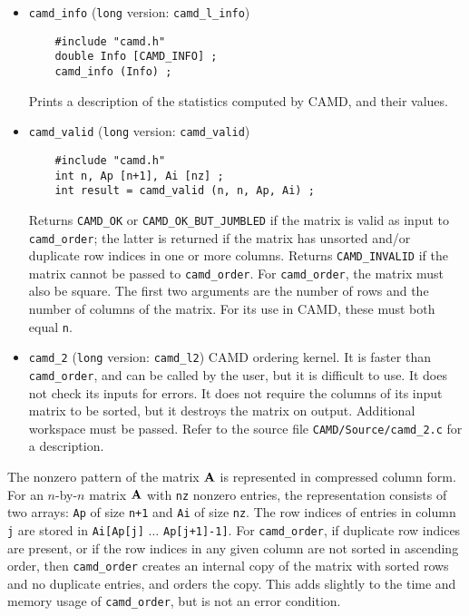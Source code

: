 \documentclass[11pt]{article}
\newcommand{\m}[1]{{\bf{#1}}}       %
\begin{document}
\begin{itemize}
\item {\tt camd\_info}
({\tt long} version: {\tt camd\_l\_info})
    {\footnotesize
    \begin{verbatim}
    #include "camd.h"
    double Info [CAMD_INFO] ;
    camd_info (Info) ;
    \end{verbatim}
    }
    Prints a description of the statistics computed by CAMD, and their values.

\item {\tt camd\_valid}
({\tt long} version: {\tt camd\_valid})
    {\footnotesize
    \begin{verbatim}
    #include "camd.h"
    int n, Ap [n+1], Ai [nz] ;
    int result = camd_valid (n, n, Ap, Ai) ;
    \end{verbatim}
    }
    Returns {\tt CAMD\_OK} or {\tt CAMD\_OK\_BUT\_JUMBLED}
    if the matrix is valid as input to {\tt camd\_order};
    the latter is returned if the matrix has unsorted and/or duplicate
    row indices in one or more columns. 
    Returns {\tt CAMD\_INVALID} if the matrix cannot be passed to
    {\tt camd\_order}.
    For {\tt camd\_order}, the matrix must
    also be square.  The first two arguments are the number of rows and the
    number of columns of the matrix.  For its use in CAMD, these must both
    equal {\tt n}.

\item {\tt camd\_2}
({\tt long} version: {\tt camd\_l2})
    CAMD ordering kernel.  It is faster than {\tt camd\_order}, and
    can be called by the user, but it is difficult to use.
    It does not check its inputs for errors.
    It does not require the columns of its input matrix to be sorted,
    but it destroys the matrix on output.  Additional workspace must be passed.
    Refer to the source file {\tt CAMD/Source/camd\_2.c} for a description.

\end{itemize}

The nonzero pattern of the matrix $\m{A}$ is represented in compressed column
form.
For an $n$-by-$n$ matrix $\m{A}$ with {\tt nz} nonzero entries, the
representation consists of two arrays: {\tt Ap} of size {\tt n+1} and {\tt Ai}
of size {\tt nz}.  The row indices of entries in column {\tt j} are stored in
    {\tt Ai[Ap[j]} $\ldots$ {\tt Ap[j+1]-1]}.
For {\tt camd\_order},
if duplicate row indices are present, or if the row indices in any given
column are not sorted in ascending order, then {\tt camd\_order} creates
an internal copy of the matrix with sorted rows and no duplicate entries,
and orders the copy.  This adds slightly to the time and memory usage of
{\tt camd\_order}, but is not an error condition.
\end{document}
